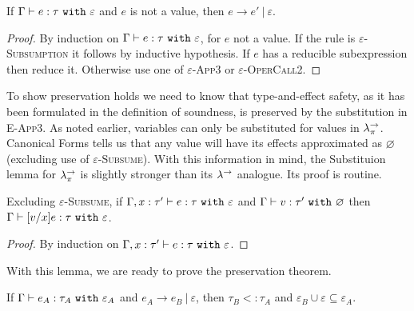 \begin{theorem}[Progress]
If $ \Gamma \vdash  e:  \tau~\mathtt{with}~ \varepsilon$ and $ e$ is not a value, then $ e \longrightarrow  e'~|~\varepsilon$.
\end{theorem}

\begin{proof} By induction on $ \Gamma \vdash  e:  \tau~\mathtt{with}~ \varepsilon$, for $ e$ not a value. If the rule is \textsc{$\varepsilon$-Subsumption} it follows by inductive hypothesis. If $ e$ has a reducible subexpression then reduce it. Otherwise use one of \textsc{$\varepsilon$-App3} or \textsc{$\varepsilon$-OperCall2}.
\end{proof}

To show preservation holds we need to know that type-and-effect safety, as it has been formulated in the definition of soundness, is preserved by the substitution in \textsc{E-App3}. As noted earlier, variables can only be substituted for values in $\lambda^{\rightarrow}_{\pi}$. Canonical Forms tells us that any value will have its effects approximated as $\varnothing$ (excluding use of \textsc{$\varepsilon$-Subsume}). With this information in mind, the Substituion lemma for $\lambda^{\rightarrow}_{\pi}$ is slightly stronger than its $\lambda^{\rightarrow}$ analogue. Its proof is routine.

\begin{lemma}[Substitution]
Excluding \textsc{$\varepsilon$-Subsume}, if $\Gamma, x: \tau' \vdash e: \tau~\mathtt{with}~ \varepsilon$ and $\Gamma \vdash v: \tau'~\mathtt{with}~ \varnothing$ then $\Gamma \vdash [v/x]e: \tau~\mathtt{with}~ \varepsilon$.
\end{lemma}

\begin{proof} By induction on $\Gamma, x: \tau' \vdash e: \tau~\mathtt{with}~ \varepsilon$.
\end{proof}

With this lemma, we are ready to prove the preservation theorem.

\begin{theorem}[Preservation]
If $\Gamma \vdash e_A: \tau_A~\mathtt{with}~ \varepsilon_A$ and $e_A \longrightarrow e_B~|~\varepsilon$, then $\tau_B <: \tau_A$ and $\varepsilon_B \cup \varepsilon \subseteq \varepsilon_A$.
\end{theorem}


